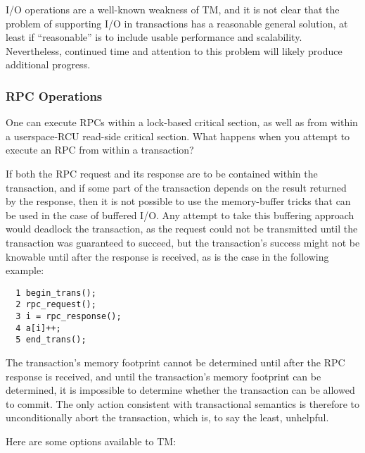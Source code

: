 I/O operations are a well-known weakness of TM, and it is not clear
that the problem of supporting I/O in transactions has a reasonable
general solution, at least if ``reasonable'' is to include usable
performance and scalability.
Nevertheless, continued time and attention to this problem will likely
produce additional progress.

\subsubsection{RPC Operations}
\label{sec:future:RPC Operations}

One can execute RPCs within a lock-based critical section, as well as
from within a userspace-RCU read-side critical section. What happens when you
attempt to execute an RPC from within a transaction?

If both the RPC request and its response are to be contained within the
transaction, and if some part of the transaction depends on the result
returned by the response, then it is not possible to use the memory-buffer
tricks that can be used in the case of buffered I/O.
Any attempt to
take this buffering approach would deadlock the transaction, as the
request could not be transmitted until the transaction was guaranteed
to succeed, but the transaction's success might not be knowable until
after the response is received, as is the case in the following example:

\vspace{5pt}
\begin{minipage}[t]{\columnwidth}
\small
\begin{verbatim}
  1 begin_trans();
  2 rpc_request();
  3 i = rpc_response();
  4 a[i]++;
  5 end_trans();
\end{verbatim}
\end{minipage}
\vspace{5pt}

The transaction's memory footprint cannot be determined until after the
RPC response is received, and until the transaction's memory footprint
can be determined, it is impossible to determine whether the transaction
can be allowed to commit.
The only action consistent with transactional semantics is therefore to
unconditionally abort the transaction, which is, to say the least,
unhelpful.

Here are some options available to TM:

